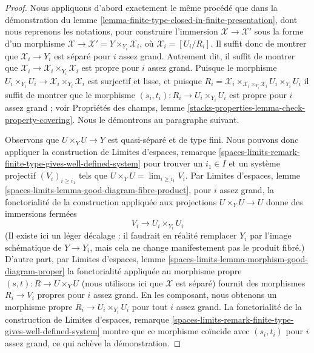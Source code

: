 \begin{proof}
Nous appliquons d'abord exactement le même procédé que dans la démonstration du
lemme \ref{lemma-finite-type-closed-in-finite-presentation}, dont nous reprenons
les notations, pour construire l'immersion $\mathcal{X} \to \mathcal{X}'$ sous
la forme d'un morphisme
$\mathcal{X} \to \mathcal{X}' = Y \times_{Y_i} \mathcal{X}_i$, où
$\mathcal{X}_i = [U_i/R_i]$. Il suffit donc de montrer que
$\mathcal{X}_i \to Y_i$ est séparé pour $i$ assez grand. Autrement dit, il
suffit de montrer que
$\mathcal{X}_i \to \mathcal{X}_i \times_{Y_i} \mathcal{X}_i$ est propre pour
$i$ assez grand. Puisque le morphisme
$U_i \times_{Y_i} U_i \to \mathcal{X}_i \times_{Y_i} \mathcal{X}_i$ est
surjectif et lisse, et puisque
$R_i = \mathcal{X}_i
\times_{\mathcal{X}_i \times_{Y_i} \mathcal{X}_i} U_i \times_{Y_i} U_i$
il suffit de montrer que le morphisme
$(s_i, t_i) : R_i \to U_i \times_{Y_i} U_i$
est propre pour $i$ assez grand ; voir Propriétés des champs, lemme
\ref{stacks-properties-lemma-check-property-covering}.
Nous le démontrons au paragraphe suivant.

\medskip\noindent
Observons que $U \times_Y U \to Y$ est quasi-séparé et de type fini. Nous
pouvons donc appliquer la construction de Limites d'espaces, remarque
\ref{spaces-limits-remark-finite-type-gives-well-defined-system}
pour trouver un $i_1 \in I$ et un système projectif $(V_i)_{i \geq i_1}$ tels
que $U \times_Y U = \lim_{i \geq i_1} V_i$. Par Limites d'espaces, lemme
\ref{spaces-limits-lemma-good-diagram-fibre-product}, pour $i$ assez grand, la
fonctorialité de la construction appliquée aux projections
$U \times_Y U \to U$ donne des immersions fermées
$$
V_i \to U_i \times_{Y_i} U_i
$$
(Il existe ici un léger décalage : il faudrait en réalité remplacer $Y_i$ par
l'image schématique de $Y \to Y_i$, mais cela ne change manifestement pas le
produit fibré.) D'autre part, par Limites d'espaces, lemme
\ref{spaces-limits-lemma-morphism-good-diagram-proper}
la fonctorialité appliquée au morphisme propre
$(s, t) : R \to U \times_Y U$ (nous utilisons ici que $\mathcal{X}$ est séparé)
fournit des morphismes $R_i \to V_i$ propres pour $i$ assez grand. En les
composant, nous obtenons un morphisme propre
$R_i \to U_i \times_{Y_i} U_i$ pour tout $i$ assez grand. La fonctorialité de
la construction de Limites d'espaces, remarque
\ref{spaces-limits-remark-finite-type-gives-well-defined-system}
montre que ce morphisme coïncide avec $(s_i, t_i)$ pour $i$ assez grand, ce qui
achève la démonstration.
\end{proof}






